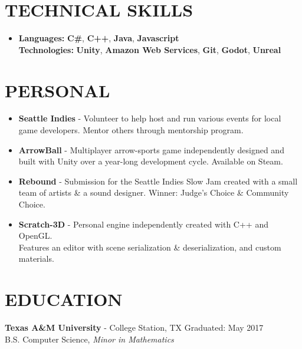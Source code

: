 \documentclass[resmargin,10pt]{res} %
\begin{document}
\begin{resume}
\section{TECHNICAL SKILLS}	
							\begin{itemize}
                    		\item[] 
\textbf{\large Languages:} \textbf{C\#}, \textbf{C++}, \textbf{Java}, \textbf{Javascript}\\
\textbf{\large Technologies:} \textbf{Unity}, \textbf{Amazon Web Services}, \textbf{Git}, \textbf{Godot}, \textbf{Unreal}
                    		\end{itemize} 
\section{PERSONAL}
				\begin{itemize}
				\item \textbf{Seattle Indies} - Volunteer to help host and run various events for local game developers. Mentor others through mentorship program.
								\item \textbf{ArrowBall} - Multiplayer arrow-sports game independently designed and built with Unity over a year-long development cycle. Available on Steam.
								\item \textbf{Rebound} - Submission for the Seattle Indies Slow Jam created with a small team of artists \& a sound designer. Winner: Judge's Choice \& Community Choice.   
				                	\item \textbf{Scratch-3D} - Personal engine independently created with C++ and OpenGL. \\Features an editor with scene serialization \& deserialization, and custom materials.
                \end{itemize}
                
\section{EDUCATION}
{\bf Texas A\&M University} - College Station, TX \hfill
Graduated: May 2017 \\
B.S. Computer Science,
\textit{Minor in Mathematics}
\end{resume} 
\end{document}
